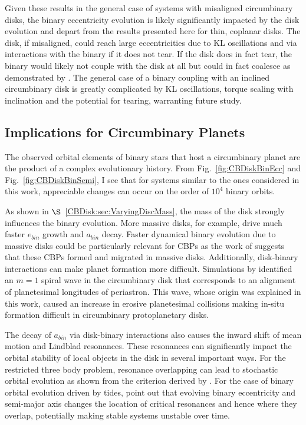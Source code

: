 Given these results in the general case of systems with 
misaligned circumbinary disks, the binary eccentricity evolution is likely significantly impacted by the disk evolution and depart from the results presented here 
for thin, coplanar disks.  The disk, if misaligned, could reach large eccentricities due to KL oscillations and via interactions with the binary if it does not tear.  If 
the disk does in fact tear, the binary would likely not couple with the disk at all but could in fact coalesce as demonstrated by \citet{Nixon2013}.  The general 
case of a binary coupling with an inclined circumbinary disk is greatly complicated by KL oscillations, torque scaling with inclination and the potential for tearing, warranting future study.

\subsection{Implications for Circumbinary Planets} \label{CBDisk:sec:cbp_implications}

The observed orbital elements of binary stars that host a circumbinary planet are the product of a complex evolutionary history.  From Fig.~\ref{fig:CBDiskBinEcc} and 
Fig.~\ref{fig:CBDiskBinSemi}, I see that for systems similar to the ones considered in this work, appreciable changes can occur on the order of $10^4$ binary orbits.  

As shown in $\S$~\ref{CBDisk:sec:VaryingDiscMass}, the mass of the disk strongly influences the binary evolution.  More massive disks, for example, drive much faster 
$e_{bin}$ growth and $a_{bin}$ decay.  Faster dynamical binary evolution due to massive disks could be particularly relevant for \kepler CBPs as the work of \citet{Dunhill2013} suggests that these CBPs formed and migrated in massive disks.  Additionally, disk-binary interactions 
can make planet formation more difficult.  Simulations by \citet{Lines2016} identified an $m = 1$ spiral wave in the circumbinary disk that corresponds to an 
alignment of planetesimal longitudes of periastron.  This wave, whose origin was explained in this work, caused an increase in erosive planetesimal 
collisions making in-situ formation difficult in circumbinary protoplanetary disks.

The decay of $a_{bin}$ via disk-binary interactions also causes the inward shift of mean motion and Lindblad resonances.  These resonances can significantly 
impact the orbital stability of local objects in the disk in several important ways.  For the restricted three body problem, resonance overlapping can lead to 
stochastic orbital evolution as shown from the criterion derived by \citet{Wisdom1980}.  For the case of binary orbital evolution driven by tides, \citet{Bromley2015} 
point out that evolving binary eccentricity and semi-major axis changes the location of critical resonances and hence where they overlap, potentially making 
stable systems unstable over time.  

